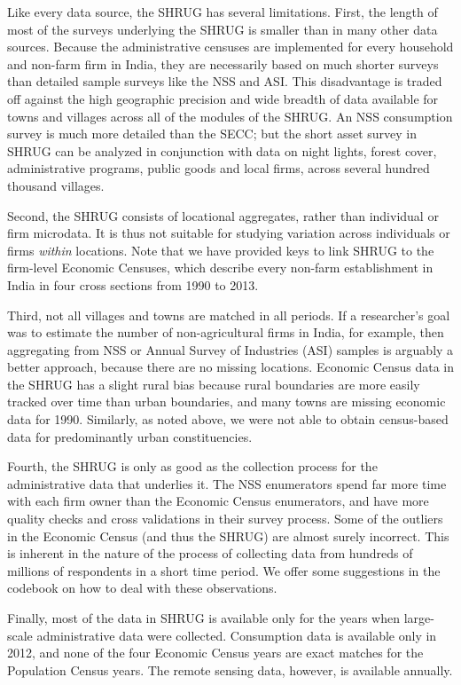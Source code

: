 \documentclass[12pt,letterpaper]{article}
\begin{document}
Like every data source, the SHRUG has several limitations. First, the
length of most of the surveys underlying the SHRUG is smaller than in
many other data sources. Because the administrative censuses are
implemented for every household and non-farm firm in India, they are
necessarily based on much shorter surveys than detailed sample surveys
like the NSS and ASI. This disadvantage is traded off against the high
geographic precision and wide breadth of data available for towns and
villages across all of the modules of the SHRUG. An NSS consumption
survey is much more detailed than the SECC; but the short asset survey
in SHRUG can be analyzed in conjunction with data on night lights,
forest cover, administrative programs, public goods and local firms,
across several hundred thousand villages.

Second, the SHRUG consists of locational aggregates, rather than individual or firm microdata. It is thus not suitable for studying variation across individuals or firms \textit{within} locations. Note that we have provided keys to link SHRUG to the firm-level Economic Censuses, which describe every non-farm establishment in India in four cross sections from 1990 to 2013.

Third, not all villages and towns are matched in all periods. If a researcher's goal was to estimate the number of non-agricultural firms in India, for example, then aggregating from NSS or Annual Survey of Industries (ASI) samples is arguably a better approach, because there are no missing locations. Economic Census data in the SHRUG has a slight rural bias because rural boundaries are more easily tracked over time than urban boundaries, and many towns are missing economic data for 1990. Similarly, as noted above, we were not able to obtain census-based data for predominantly urban constituencies.

Fourth, the SHRUG is only as good as the collection process for the administrative data that underlies it. The NSS enumerators spend far more time with each firm owner than the Economic Census enumerators, and have more quality checks and cross validations in their survey process. Some of the outliers in the Economic Census (and thus the SHRUG) are almost surely incorrect. This is inherent in the nature of the process of collecting data from hundreds of millions of respondents in a short time period. We offer some suggestions in the codebook on how to deal with these observations.

Finally, most of the data in SHRUG is available only for the years
when large-scale administrative data were collected. Consumption data
is available only in 2012, and none of the four Economic Census years
are exact matches for the Population Census years. The remote sensing
data, however, is available annually.
\end{document}
